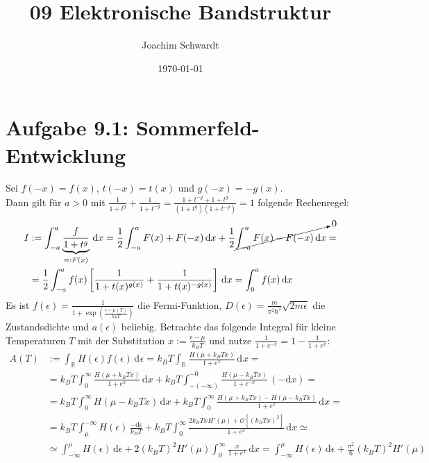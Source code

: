 \documentclass[a4paper,12pt]{article}
\newcommand{\intx}{}
\newcommand{\intr}{}
\newcommand{\kla}{}
\newcommand{\klam}{}
\begin{document}
\title{09 Elektronische Bandstruktur}
\author{Joachim Schwardt}
\date{\today}
\maketitle

\section*{Aufgabe 9.1: Sommerfeld-Entwicklung}
Sei $f(-x)=f(x)$, $t(-x)=t(x)$ und $g(-x)=-g(x)$.\\ 
Dann gilt für $a>0$ mit $\frac{1}{1+t^g}+\frac{1}{1+t^{-g}}=\frac{1+t^{-g}+1+t^g}{(1+t^g)(1+t^{-g})}=1$ folgende Rechenregel:
\begin{align*}
I&:=\intx\int_{-a}^{a}\underbrace{\frac{f}{1+t^g}}_{=:F(x)}\,\mathrm{d}x=\frac{1}{2}\intx\int_{-a}^{a}F(x)+F(-x)\,\mathrm{d}x+\frac{1}{2}\cancelto{0}{\intx\int_{-a}^{a}F(x)-F(-x)\,\mathrm{d}x}=\\
&=\frac{1}{2}\intx\int_{-a}^{a}f(x)\klam\left[ {\frac{1}{1+t(x)^{g(x)}}+\frac{1}{1+t(x)^{-g(x)}}} \right]\,\mathrm{d}x=\intx\int_{0}^{a}f(x)\,\mathrm{d}x
\end{align*}
Es ist $f(\epsilon)=\frac{1}{1+\exp\kla\left( {\frac{\epsilon -\mu (T)}{k_BT}} \right)}$ die Fermi-Funktion, $D(\epsilon)=\frac{m}{\pi^2\hbar^2}\sqrt{2m\epsilon}$ die Zustandsdichte und $a(\epsilon)$ beliebig. Betrachte das folgende Integral für kleine Temperaturen $T$ mit der Substitution $x:=\frac{\epsilon -\mu }{k_BT}$ und nutze $\frac{1}{1+e^{-x}}=1-\frac{1}{1+e^x}$:
\begin{align*}
A(T)&:=\intr\int_{\mathbb{R}^{ }}{H(\epsilon )f(\epsilon )}\,\mathrm{d}^{ }\epsilon = k_BT\intr\int_{\mathbb{R}^{ }}{\frac{H(\mu +k_BTx)}{1+e^x}}\,\mathrm{d}^{ }x=\\
&=k_BT\intx\int_{0}^{\infty}\frac{H(\mu +k_BTx)}{1+e^x}\,\mathrm{d}x+k_BT\intx\int_{-(-\infty)}^{-0}\frac{H(\mu -k_BTx)}{1+e^{-x}}\,(-\mathrm{d}x)=\\
&=k_BT\intx\int_{0}^{\infty}H(\mu -k_BTx)\,\mathrm{d}x+ k_BT\intx\int_{0}^{\infty}\frac{H(\mu +k_BTx)-H(\mu -k_BTx)}{1+e^x}\,\mathrm{d}x=\\
&=k_BT\intx\int_{\mu}^{-\infty }H(\epsilon)\,\frac{-\mathrm{d}\epsilon}{k_BT} + k_BT\intx\int_{0}^{\infty}\frac{2k_BTxH'(\mu)+\mathcal{O}[(k_BTx)^2]}{1+e^x}\,\mathrm{d}x\simeq\\
&\simeq\intx\int_{-\infty}^{\mu }H(\epsilon)\,\mathrm{d}\epsilon +2(k_BT)^2H'(\mu)\intx\int_{0}^{\infty}\frac{x}{1+e^x}\,\mathrm{d}x=\intx\int_{-\infty}^{\mu }H(\epsilon)\,\mathrm{d}\epsilon +\frac{\pi^2}{6} (k_BT)^2H'(\mu)
\end{align*}
\end{document}
